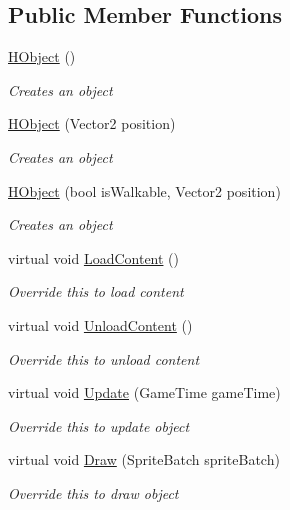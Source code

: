 \subsection*{Public Member Functions}
\begin{DoxyCompactItemize}
\item 
\hyperlink{class_hel_project_1_1_game_world_1_1_h_object_ac10ea2725a0721b3f60d8e04bc89eda5}{H\+Object} ()
\begin{DoxyCompactList}\small\item\em Creates an object \end{DoxyCompactList}\item 
\hyperlink{class_hel_project_1_1_game_world_1_1_h_object_a4c6d74d0ac6cabce471ddc176bc20321}{H\+Object} (Vector2 position)
\begin{DoxyCompactList}\small\item\em Creates an object \end{DoxyCompactList}\item 
\hyperlink{class_hel_project_1_1_game_world_1_1_h_object_a8717f6ef86d820de6ab113b516ef039f}{H\+Object} (bool is\+Walkable, Vector2 position)
\begin{DoxyCompactList}\small\item\em Creates an object \end{DoxyCompactList}\item 
virtual void \hyperlink{class_hel_project_1_1_game_world_1_1_h_object_a2de39710b20f7af4e1e2463ca93656f8}{Load\+Content} ()
\begin{DoxyCompactList}\small\item\em Override this to load content \end{DoxyCompactList}\item 
virtual void \hyperlink{class_hel_project_1_1_game_world_1_1_h_object_a30efa177423e89a85e45b76fe35d6724}{Unload\+Content} ()
\begin{DoxyCompactList}\small\item\em Override this to unload content \end{DoxyCompactList}\item 
virtual void \hyperlink{class_hel_project_1_1_game_world_1_1_h_object_a2e4ba3d334e48c9b74cc1b2b821f030b}{Update} (Game\+Time game\+Time)
\begin{DoxyCompactList}\small\item\em Override this to update object \end{DoxyCompactList}\item 
virtual void \hyperlink{class_hel_project_1_1_game_world_1_1_h_object_aa48c9288756739f80a59bdf6f4fe7f3f}{Draw} (Sprite\+Batch sprite\+Batch)
\begin{DoxyCompactList}\small\item\em Override this to draw object \end{DoxyCompactList}\end{DoxyCompactItemize}
